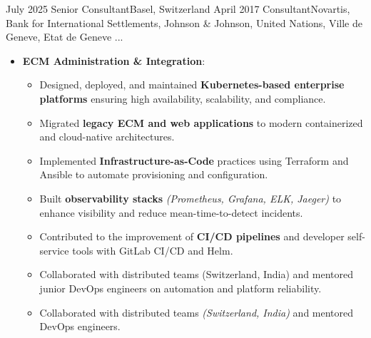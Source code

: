 
\begin{experiences}

\consultantexperience
    {July 2025} {Senior Consultant}{}{Basel, Switzerland}
    {April 2017}    {Consultant}{Novartis, Bank for International Settlements, Johnson \& Johnson, United Nations, Ville de Geneve, Etat de Geneve ...} {
        \begin{itemize}[left=0pt,label={},itemsep=0.5em]
        \vspace{0.5em}  %
          \item \textbf{ECM Administration \& Integration}:
            \begin{itemize}[itemsep=0.2em,topsep=0.2em,parsep=0pt]
              \small
              \item Designed, deployed, and maintained \textbf{Kubernetes-based enterprise platforms} ensuring high availability, scalability, and compliance.
              \item Migrated \textbf{legacy ECM and web applications} to modern containerized and cloud-native architectures.
              \item Implemented \textbf{Infrastructure-as-Code} practices using Terraform and Ansible to automate provisioning and configuration.
              \item Built \textbf{observability stacks} \emph{(Prometheus, Grafana, ELK, Jaeger)} to enhance visibility and reduce mean-time-to-detect incidents.
              \item Contributed to the improvement of \textbf{CI/CD pipelines} and developer self-service tools with GitLab CI/CD and Helm.
              \item Collaborated with distributed teams (Switzerland, India) and mentored junior DevOps engineers on automation and platform reliability.
              \item Collaborated with distributed teams \emph{(Switzerland, India)} and mentored DevOps engineers.
            \end{itemize}


\end{itemize}}
\end{experiences}
